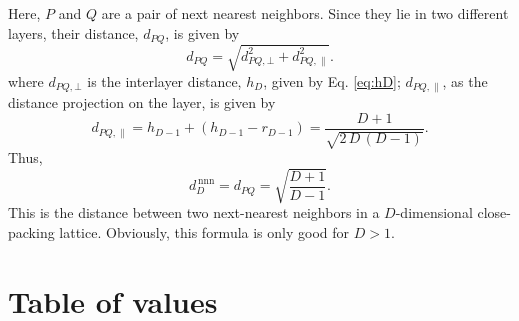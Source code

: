 \documentclass{article}
\begin{document}
Here, $P$ and $Q$ are a pair of next nearest neighbors.
%
Since they lie in two different layers,
their distance, $d_{PQ}$, is given by
$$
d_{PQ}
=
\sqrt{
  d_{PQ, \bot}^2
  +
  d_{PQ, \parallel}^2
}.
$$
where
$d_{PQ, \bot}$
is the interlayer distance, $h_D$,
given by Eq. \eqref{eq:hD};
$d_{PQ, \parallel}$,
as the distance projection on the layer,
is given by
$$
d_{PQ, \parallel}
=
h_{D - 1} + ( h_{D - 1} - r_{D - 1} )
=
\frac{                   D + 1    }
     { \sqrt{ 2 \, D \, (D - 1) } }.
$$
Thus,
$$
d^\mathrm{\,nnn}_D
=
d_{PQ}
=
\sqrt{ \frac{ D + 1 } { D - 1 } }.
$$
This is the distance between two next-nearest neighbors
in a $D$-dimensional close-packing lattice.
%
Obviously, this formula is only good for $D > 1$.



\section{Table of values}
\end{document}
